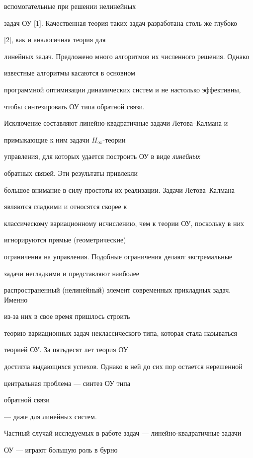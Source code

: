 вспомогательные при решении нелинейных


задач ОУ [1]. Качественная теория таких задач разработана столь же глубоко


[2], как и аналогичная теория для


линейных задач. Предложено много алгоритмов их численного решения. Однако


известные алгоритмы касаются в основном


программной оптимизации динамических систем и не настолько эффективны,


чтобы синтезировать ОУ типа обратной связи.


Исключение составляют линейно-квадратичные задачи Летова--Калмана и


примыкающие к ним задачи $H_\infty$-теории


управления, для которых удается построить ОУ в виде {\it линейных}


обратных связей. Эти результаты привлекли


большое внимание в силу простоты их реализации. Задачи Летова--Калмана


являются гладкими и относятся скорее к


классическому вариационному исчислению, чем к теории ОУ, поскольку в них


игнорируются прямые (геометрические)


ограничения на управления. Подобные ограничения делают экстремальные


задачи негладкими и представляют наиболее


распространенный (нелинейный) элемент современных прикладных задач. Именно


из-за них в свое время пришлось строить


теорию вариационных задач неклассического типа, которая стала называться


теорией ОУ. За пятьдесят лет теория ОУ


достигла выдающихся успехов. Однако в ней до сих пор остается нерешенной


центральная проблема --- синтез ОУ типа


обратной связи


--- даже для линейных систем.





Частный случай исследуемых в работе задач --- линейно-квадратичные задачи


ОУ --- играют большую роль в бурно


